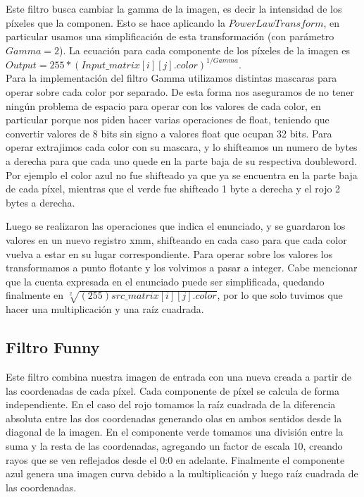 \documentclass[a4paper]{article}
\begin{document}
Este filtro busca cambiar la gamma de la imagen, es decir la intensidad de los píxeles que la componen. Esto se hace aplicando la $Power Law Transform$, en particular usamos una simplificación de esta transformación (con parámetro $Gamma = 2$). La ecuación para cada componente de los píxeles de la imagen es $Output = 255*(Input\_matrix[i][j].color)^{1/Gamma}$.\\
Para la implementación del filtro Gamma utilizamos distintas mascaras para operar sobre cada color por separado. De esta forma nos aseguramos de no tener ningún problema de espacio para operar con los valores de cada color, en particular porque nos piden hacer varias operaciones de float, teniendo que convertir valores de 8 bits sin signo a valores float que ocupan 32 bits. Para operar extrajimos cada color con su mascara, y lo shifteamos un numero de bytes a derecha para que cada uno quede en la parte baja de su respectiva doubleword. Por ejemplo el color azul no fue shifteado ya que ya se encuentra en la parte baja de cada píxel, mientras que el verde fue shifteado 1 byte a derecha y el rojo 2 bytes a derecha.

Luego se realizaron las operaciones que indica el enunciado, y se guardaron los valores en un nuevo registro xmm, shifteando en cada caso para que cada color vuelva a estar en su lugar correspondiente. Para operar sobre los valores los transformamos a punto flotante y los volvimos a pasar a integer. Cabe mencionar que la cuenta expresada en el enunciado puede ser simplificada,  quedando finalmente en $\sqrt[2]{(255)src\_matrix[i][j].color}$, por lo que solo tuvimos que hacer una multiplicación y una raíz cuadrada.




\subsection{Filtro Funny}

Este filtro combina nuestra imagen de entrada con una nueva creada a partir de las coordenadas de cada píxel. Cada componente de píxel se calcula de forma independiente. En el caso del rojo tomamos la raíz cuadrada de la diferencia absoluta entre las dos coordenadas generando olas en ambos sentidos desde la diagonal de la imagen.
En el componente verde tomamos una división entre la suma y la resta de las coordenadas, agregando un factor de escala 10, creando rayos que se ven reflejados desde el 0:0 en adelante. Finalmente el componente azul genera una imagen curva debido a la multiplicación y luego raíz cuadrada de las coordenadas.
\end{document}
